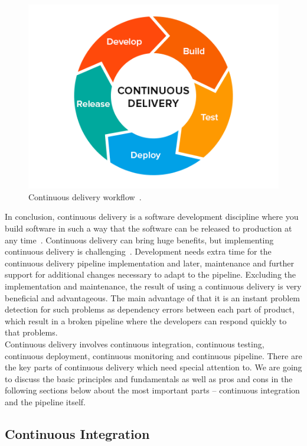 \documentclass[12pt,a4paper]{article}
\theoremstyle{definition}
\begin{document}
    \begin{figure}[H]
        \centering
        \includegraphics[scale=0.5]{img/cd.png}
        \caption{Continuous delivery workflow~\cite{cd1}.}
        \label{fig:cd}
    \end{figure}

    In conclusion, continuous delivery is a software development discipline where you build software in such a way that the software can be released to production at any time~\cite{cd2}. Continuous delivery can bring huge benefits, but implementing continuous delivery is challenging~\cite{8452107}. Development needs extra time for the continuous delivery pipeline implementation and later, maintenance and further support for additional changes necessary to adapt to the pipeline. Excluding the implementation and maintenance, the result of using a continuous delivery is very beneficial and advantageous. The main advantage of that it is an instant problem detection for such problems as dependency errors between each part of product, which result in a broken pipeline where the developers can respond quickly to that problems.\\

    Continuous delivery involves continuous integration, continuous testing, continuous deployment, continuous monitoring and continuous pipeline. There are the key parts of continuous delivery which need special attention to. We are going to discuss the basic principles and fundamentals as well as pros and cons in the following sections below about the most important parts -- continuous integration and the pipeline itself.

    \subsection{Continuous Integration}
\end{document}
